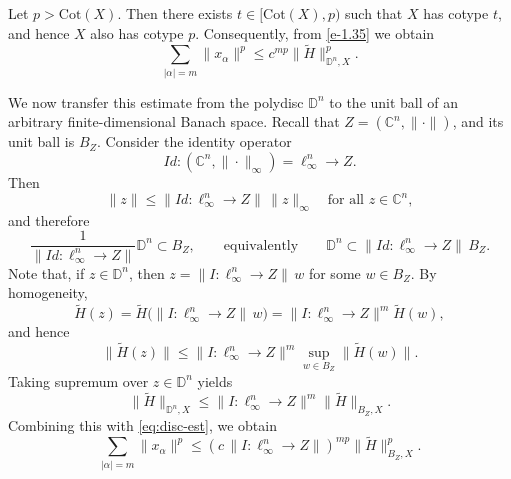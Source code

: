 \documentclass[a4paper,11pt, reqno]{amsart}
\theoremstyle{definition}
\begin{document}
Let $p>\mathrm{Cot}(X)$. Then there exists $t\in[\mathrm{Cot}(X),p)$ such that $X$ has cotype $t$, and hence $X$ also has cotype $p$. Consequently, from \eqref{e-1.35} we obtain
\begin{equation}\label{eq:disc-est}
	\sum_{|\alpha|=m}\|x_{\alpha}\|^p
	\leq c^{mp}\|\widetilde H\|_{\mathbb{D}^n,X}^p.
\end{equation}

\medskip

We now transfer this estimate from the polydisc $\mathbb{D}^n$ to the unit ball of an arbitrary finite-dimensional Banach space. Recall that $Z=(\mathbb C^n,\|\cdot\|)$, and its unit ball is $B_Z$.
Consider the identity operator
\[
Id:(\mathbb C^n,\|\cdot\|_\infty)=\ell_\infty^n \longrightarrow Z.
\]
Then
\[
\|z\|\le \|Id:\ell_\infty^n\to Z\|\,\|z\|_\infty
\quad \text{for all } z\in\mathbb C^n,
\]
and therefore
\[
\frac{1}{\|Id:\ell_\infty^n\to Z\|}\mathbb D^n\subset B_Z,
\qquad\text{equivalently}\qquad
\mathbb D^n\subset \|Id:\ell_\infty^n\to Z\|\, B_Z.
\]
Note that, if $z\in \mathbb D^n$, then
$z=\|I:\ell_\infty^n\to Z\|\,w$ for some $w\in B_Z$. By homogeneity,
\[
\widetilde{H}(z)=\widetilde{H}\big(\|I:\ell_\infty^n\to Z\|\,w\big)
=\|I:\ell_\infty^n\to Z\|^m \widetilde{H}(w),
\]
and hence
\[
\|\widetilde{H}(z)\|
\le \|I:\ell_\infty^n\to Z\|^m \sup_{w\in B_Z}\|\widetilde{H}(w)\|.
\]
Taking supremum over $z\in\mathbb D^n$ yields
\[
\|\widetilde{H}\|_{\mathbb D^n,X}
\le \|I:\ell_\infty^n\to Z\|^m \|\widetilde{H}\|_{B_Z,X}.
\]
Combining this with \eqref{eq:disc-est}, we obtain
\begin{equation}\label{eq:ballZ}
	\sum_{|\alpha|=m}\|x_\alpha\|^p
	\le (c\,\|I:\ell_\infty^n\to Z\|)^{mp}\|\widetilde{H}\|_{B_Z,X}^p.
\end{equation}

\medskip
\end{document}
